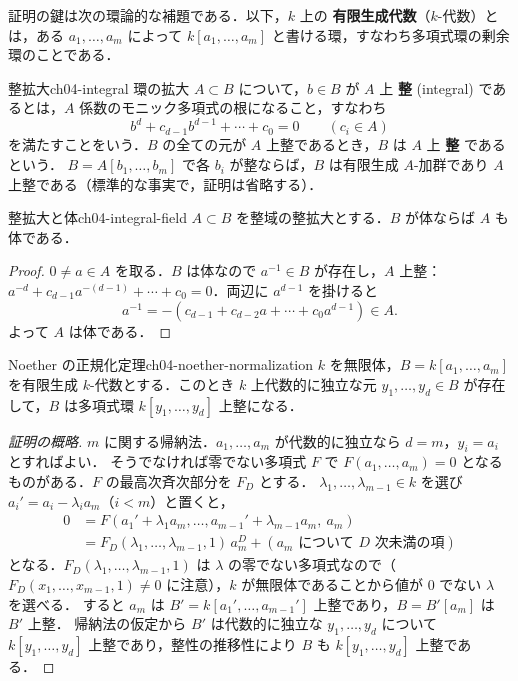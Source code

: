 証明の鍵は次の環論的な補題である．以下，$k$ 上の \textbf{有限生成代数}（$k$-代数）とは，ある $a_1,\dots,a_m$ によって $k[a_1,\dots,a_m]$ と書ける環，すなわち多項式環の剰余環のことである．

\begin{mydef}{整拡大}{ch04-integral}
環の拡大 $A\subset B$ について，$b\in B$ が $A$ 上 \textbf{整} (integral) であるとは，$A$ 係数のモニック多項式の根になること，すなわち
\[
  b^d+c_{d-1}b^{d-1}+\cdots+c_0=0\qquad(c_i\in A)
\]
を満たすことをいう．$B$ の全ての元が $A$ 上整であるとき，$B$ は $A$ 上 \textbf{整} であるという．
$B=A[b_1,\dots,b_m]$ で各 $b_i$ が整ならば，$B$ は有限生成 $A$-加群であり $A$ 上整である（標準的な事実で，証明は省略する）．
\end{mydef}

\begin{mylem}{整拡大と体}{ch04-integral-field}
$A\subset B$ を整域の整拡大とする．$B$ が体ならば $A$ も体である．
\end{mylem}

\begin{proof}
$0\ne a\in A$ を取る．$B$ は体なので $a^{-1}\in B$ が存在し，$A$ 上整：
$a^{-d}+c_{d-1}a^{-(d-1)}+\cdots+c_0=0$．両辺に $a^{d-1}$ を掛けると
\[
  a^{-1}=-(c_{d-1}+c_{d-2}a+\cdots+c_0a^{d-1})\in A.
\]
よって $A$ は体である．
\end{proof}

\begin{mythm}{Noether の正規化定理}{ch04-noether-normalization}
$k$ を無限体，$B=k[a_1,\dots,a_m]$ を有限生成 $k$-代数とする．このとき $k$ 上代数的に独立な元 $y_1,\dots,y_d\in B$ が存在して，$B$ は多項式環 $k[y_1,\dots,y_d]$ 上整になる．
\end{mythm}

\begin{proof}[証明の概略]
$m$ に関する帰納法．$a_1,\dots,a_m$ が代数的に独立なら $d=m$，$y_i=a_i$ とすればよい．
そうでなければ零でない多項式 $F$ で $F(a_1,\dots,a_m)=0$ となるものがある．$F$ の最高次斉次部分を $F_D$ とする．
$\lambda_1,\dots,\lambda_{m-1}\in k$ を選び $a_i'=a_i-\lambda_ia_m$（$i<m$）と置くと，
\[
  \begin{aligned}
  0&=F(a_1'+\lambda_1a_m,\dots,a_{m-1}'+\lambda_{m-1}a_m,\ a_m)\\
   &=F_D(\lambda_1,\dots,\lambda_{m-1},1)\,a_m^D+(a_m\text{ について }D\text{ 次未満の項})
  \end{aligned}
\]
となる．$F_D(\lambda_1,\dots,\lambda_{m-1},1)$ は $\lambda$ の零でない多項式なので（$F_D(x_1,\dots,x_{m-1},1)\ne0$ に注意），$k$ が無限体であることから値が $0$ でない $\lambda$ を選べる．
すると $a_m$ は $B'=k[a_1',\dots,a_{m-1}']$ 上整であり，$B=B'[a_m]$ は $B'$ 上整．
帰納法の仮定から $B'$ は代数的に独立な $y_1,\dots,y_d$ について $k[y_1,\dots,y_d]$ 上整であり，整性の推移性により $B$ も $k[y_1,\dots,y_d]$ 上整である．
\end{proof}

